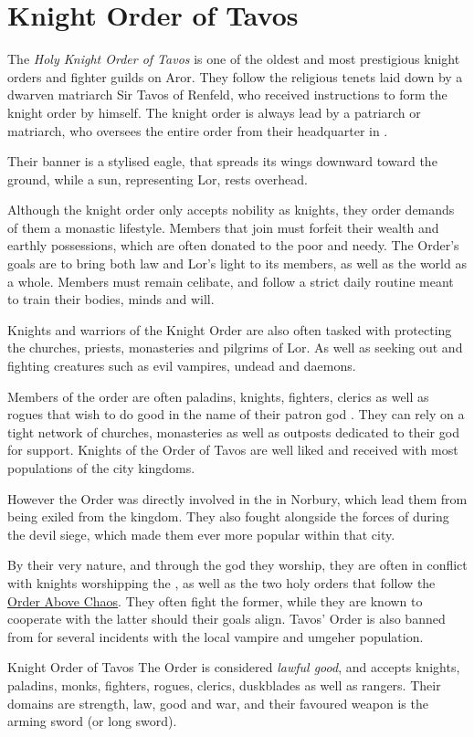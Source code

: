 \section{Knight Order of Tavos}
\label{sec:Knight Order of Tavos}

The \emph{Holy Knight Order of Tavos} is one of the oldest and most
prestigious knight orders and fighter guilds on Aror. They follow the
religious tenets laid down by a dwarven matriarch Sir Tavos of Renfeld, who
received instructions to form the knight order by  himself.
The knight order is always lead by a patriarch or matriarch, who oversees the
entire order from their headquarter in .

Their banner is a stylised eagle, that spreads its wings downward toward the
ground, while a sun, representing Lor, rests overhead.

Although the knight order only accepts nobility as knights, they order demands
of them a monastic lifestyle. Members that join must forfeit their wealth and
earthly possessions, which are often donated to the poor and needy. The
Order's goals are to bring both law and Lor's light to its members, as well as
the world as a whole. Members must remain celibate, and follow a strict daily
routine meant to train their bodies, minds and will.

Knights and warriors of the Knight Order are also often tasked with protecting
the churches, priests, monasteries and pilgrims of Lor. As well as seeking out
and fighting creatures such as evil vampires, undead and daemons.

Members of the order are often paladins, knights, fighters, clerics as well as
rogues that wish to do good in the name of their patron god .
They can rely on a tight network of churches, monasteries as well as outposts
dedicated to their god for support. Knights of the Order of Tavos are well liked
and received with most populations of the city kingdoms.

However the Order was directly involved in the 
in Norbury, which lead them from being exiled from the kingdom. They also fought
alongside the forces of  during the devil siege, which made
them ever more popular within that city.

By their very nature, and through the god they worship, they are often in
conflict with knights worshipping the , as well as
the two holy orders that follow the \hyperref[sec:Order]{Order Above Chaos}.
They often fight the former, while they are known to cooperate with the latter
should their goals align. Tavos' Order is also banned from
 for several incidents with the local vampire and
umgeher population.

\begin{35e}{Knight Order of Tavos}
  The Order is considered \emph{lawful good}, and accepts knights, paladins,
  monks, fighters, rogues, clerics, duskblades as well as rangers. Their domains
  are strength, law, good and war, and their favoured weapon is the arming
  sword (or long sword).
\end{35e}
